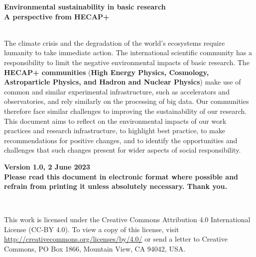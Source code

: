 \documentclass[../SustainableHEP.tex]{subfiles}
\begin{document}
\RaggedRight
\sloppy
\begin{titlepage}

    \doublespacing    
    \begin{flushleft}
    \textbf{\huge Environmental sustainability in basic research}\\
    \textbf{\Large A perspective from HECAP+}
    \end{flushleft}
    \singlespacing

    \vspace{27em}

    \\

    \noindent The climate crisis and the degradation of the world's ecosystems require humanity to take immediate action. The international scientific community has a responsibility to limit the negative environmental impacts of basic research. The \textbf{HECAP+ communities} (\textbf{High Energy Physics, Cosmology, Astroparticle Physics, and Hadron and Nuclear Physics}) make use of common and similar experimental infrastructure, such as accelerators and observatories, and rely similarly on the processing of big data. Our communities therefore face similar challenges to improving the sustainability of our research. This document aims to reflect on the environmental impacts of our work practices and research infrastructure, to highlight best practice, to make recommendations for positive changes, and to identify the opportunities and challenges that such changes present for wider aspects of social responsibility.\\
           
    \begin{flushright}
        \textbf{Version 1.0, 2 June 2023}\\
        \textbf{\textcolor{Pythongreen}{Please read this document in electronic format where possible and refrain from printing it unless absolutely necessary. Thank you.}}
    \end{flushright}

\end{titlepage}

\newpage

\thispagestyle{empty}

~

\vspace{18em}
\RaggedRight

\noindent This work is licensed under the Creative Commons Attribution 4.0 International License (CC-BY 4.0). To view a copy of this license, visit \url{http://creativecommons.org/licenses/by/4.0/} or send a letter to Creative Commons, PO Box 1866, Mountain View, CA 94042, USA.
\end{document}
